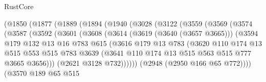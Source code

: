 \begin{lexlean}{RustCore}
\begin{coremodule}
                (@1850
                  (@1877
                    (@1889
                      (@1894
                        (@1940
                          (@3028
                            (@3122
                              (@3559
                                (@3569
                                  (@3574
                                    (@3587
                                      (@3592
                                        (@3601
                                          (@3608
                                            (@3614
                                              (@3619 (@3640 (@3657 @3665)))
                                              (@3594
                                                @179
                                                @132
                                                @13
                                                @16
                                                @783
                                                @615
                                                (@3616
                                                  @179
                                                  @13
                                                  @783
                                                  (@3620
                                                    @110
                                                    @174
                                                    @13
                                                    @515
                                                    @553
                                                    @515
                                                    @783
                                                    @3639
                                                    (@3641
                                                      @110
                                                      @174
                                                      @13
                                                      @515
                                                      @563
                                                      @515
                                                      @777
                                                      @3665
                                                      @3656)))
                                                (@2621 @3128 @732))))))
                                      (@2948 (@2950 @166 @65 @772))))
                                  (@3570
                                    @189
                                    @65
                                    @515

\end{coremodule}
\end{lexlean}
